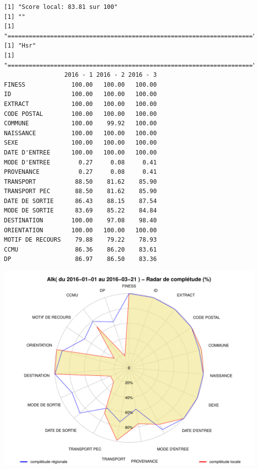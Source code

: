 \documentclass[]{article}
\begin{document}
\begin{verbatim}
[1] "Score local: 83.81 sur 100"
[1] ""
[1] "====================================================================="
[1] "Hsr"
[1] "====================================================================="
                 2016 - 1 2016 - 2 2016 - 3
FINESS             100.00   100.00   100.00
ID                 100.00   100.00   100.00
EXTRACT            100.00   100.00   100.00
CODE POSTAL        100.00   100.00   100.00
COMMUNE            100.00    99.92   100.00
NAISSANCE          100.00   100.00   100.00
SEXE               100.00   100.00   100.00
DATE D'ENTREE      100.00   100.00   100.00
MODE D'ENTREE        0.27     0.08     0.41
PROVENANCE           0.27     0.08     0.41
TRANSPORT           88.50    81.62    85.90
TRANSPORT PEC       88.50    81.62    85.90
DATE DE SORTIE      86.43    88.15    87.54
MODE DE SORTIE      83.69    85.22    84.84
DESTINATION        100.00    97.08    98.40
ORIENTATION        100.00   100.00   100.00
MOTIF DE RECOURS    79.88    79.22    78.93
CCMU                86.36    86.20    83.61
DP                  86.97    86.50    83.36
\end{verbatim}

\includegraphics{completude_files/figure-latex/finess-14.pdf}
\end{document}
